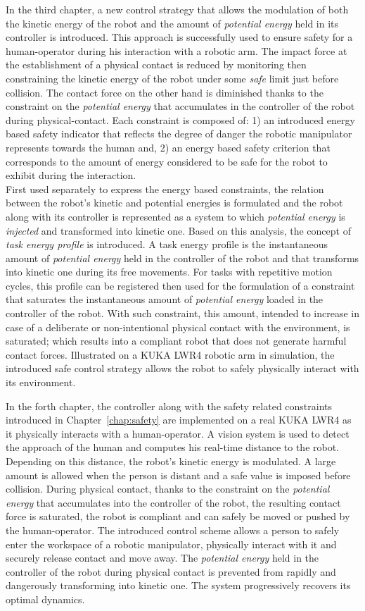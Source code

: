 In the third chapter, a new control strategy that allows the modulation of both the kinetic energy of the robot and the amount of \textit{potential energy} held in its controller is introduced. This approach is successfully used to ensure safety for a human-operator during his interaction with a robotic arm. The impact force at the establishment of a physical contact is reduced by monitoring then constraining the kinetic energy of the robot under some \textit{safe} limit just before collision. The contact force on the other hand is diminished thanks to the constraint on the \textit{potential energy} that accumulates in the controller of the robot during physical-contact. Each constraint is composed of: 1) an introduced energy based safety indicator that reflects the degree of danger  the robotic manipulator represents towards the human and, 2) an energy based safety criterion that corresponds to the amount of energy considered to be safe for the robot to exhibit during the interaction. \\
First used separately to express the energy based constraints, the relation between the robot's kinetic and potential energies is formulated and the robot along with its controller is represented as a system to which \textit{potential energy} is \textit{injected} and transformed into kinetic one. Based on this analysis, the concept of \textit{task energy profile} is introduced. A task energy profile is the instantaneous amount of \textit{potential energy} held in the controller of the robot and that transforms into kinetic one during its free movements. For tasks with repetitive motion cycles, this profile can be registered then used for the formulation of a constraint that saturates the instantaneous amount of \textit{potential energy} loaded in the controller of the robot. With such constraint, this amount, intended to increase in case of a deliberate or non-intentional physical contact with the environment, is saturated; which results into a compliant robot that does not generate harmful contact forces. Illustrated on a KUKA LWR4 robotic arm in simulation, the introduced safe control strategy allows the robot to safely physically interact with its environment.

In the forth chapter, the controller along with the safety related constraints introduced in Chapter~\ref{chap:safety} are implemented on a real KUKA LWR4 as it physically interacts with a human-operator. A vision system is used to detect the approach of the human and computes his real-time distance to the robot. Depending on this distance, the robot's kinetic energy is modulated. A large amount is allowed when the person is distant and a safe value is imposed before collision. During physical contact, thanks to the constraint on the \textit{potential energy} that accumulates into the controller of the robot, the resulting contact force is saturated, the robot is compliant and can safely be moved or pushed by the human-operator. The introduced control scheme allows a person to safely enter the workspace of a robotic manipulator, physically interact with it and securely release contact and move away. The \textit{potential energy} held in the controller of the robot during physical contact is prevented from rapidly and dangerously transforming into kinetic one. The system progressively recovers its optimal dynamics.
